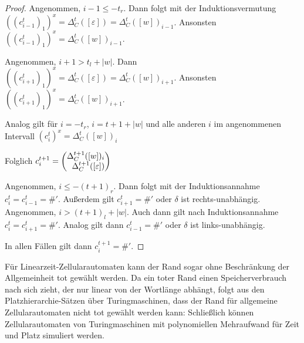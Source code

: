 \begin{proof}
    Angenommen, $i - 1 \leq -t_r$. Dann folgt mit der Induktionsvermutung $((c^t_{i-1})_1)^x = \Delta^t_{C}([\varepsilon]) = \Delta^t_{C}([w])_{i-1}$.
    Ansonsten $((c^t_{i-1})_1)^x = \Delta^t_C([w])_{i-1}$.
    
    Angenommen, $i + 1 > t_l + |w|$. Dann $((c^t_{i+1})_1)^x = \Delta^t_{C}([\varepsilon]) = \Delta^t_{C}([w])_{i+1}$.
    Ansonsten $((c^t_{i+1})_1)^x = \Delta^t_C([w])_{i+1}$.
    
    Analog gilt für $i = -t_r$, $i = t + 1 + |w|$ und alle anderen $i$ im angenommenen Intervall $(c^t_{i})^x = \Delta^t_C([w])_i$
    
    Folglich $c^{t+1}_i = \Spvek{\Delta^{t+1}_C([w])_i; \Delta^{t+1}_{C}([\varepsilon])}$
    
    Angenommen, $i \leq -(t+1)_r$. Dann folgt mit der Induktionsannahme $c^t_{i} = c^t_{i-1} = \#'$.
    Außerdem gilt $c^t_{i+1} = \#'$ oder $\delta$ ist rechts-unabhängig.
    Angenommen, $i > (t+1)_l + |w|$. Auch dann gilt nach Induktionsannahme $c^t_{i} = c^t_{i+1} = \#'$.
    Analog gilt dann $c^t_{i-1} = \#'$ oder $\delta$ ist links-unabhängig.
    
    In allen Fällen gilt dann $c^{t+1}_i = \#'$.
\end{proof}

Für Linearzeit-Zellularautomaten kann der Rand sogar ohne Beschränkung der Allgemeinheit tot gewählt werden.
Da ein toter Rand einen Speicherverbrauch nach sich zieht, der nur linear von der Wortlänge abhängt, folgt aus den Platzhierarchie-Sätzen über Turingmaschinen,
dass der Rand für allgemeine Zellularautomaten nicht tot gewählt werden kann:
Schließlich können Zellularautomaten von Turingmaschinen mit polynomiellen Mehraufwand für Zeit und Platz simuliert werden.


